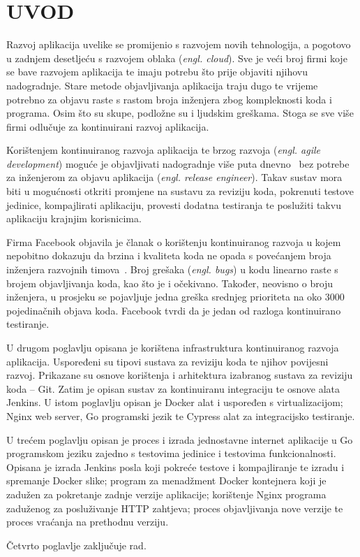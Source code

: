 \chapter{UVOD}
Razvoj aplikacija uvelike se promijenio s razvojem novih tehnologija, a pogotovo u zadnjem
desetljeću s razvojem oblaka (\textit{engl. cloud}). Sve je veći broj firmi koje se bave razvojem
aplikacija te imaju potrebu što prije objaviti njihovu nadogradnje. Stare metode objavljivanja
aplikacija traju dugo te vrijeme potrebno za objavu raste s rastom broja inženjera zbog kompleknosti
koda i programa. Osim što su skupe, podložne su i ljudskim greškama. Stoga se sve više firmi
odlučuje za kontinuirani razvoj aplikacija.

Korištenjem kontinuiranog razvoja aplikacija te brzog razvoja (\textit{engl. agile development})
moguće je objavljivati nadogradnje više puta dnevno~\citep{abrahamsson2017agile} bez potrebe za
inženjerom za objavu aplikacija (\textit{engl. release engineer}). Takav sustav mora biti u
mogućnosti otkriti promjene na sustavu za reviziju koda, pokrenuti testove jedinice, kompajlirati
aplikaciju, provesti dodatna testiranja te poslužiti takvu aplikaciju krajnjim korisnicima.

Firma Facebook objavila je članak o korištenju kontinuiranog razvoja u kojem nepobitno dokazuju da
brzina i kvaliteta koda ne opada s povećanjem broja inženjera razvojnih
timova~\citep{rossi2016continuous}. Broj grešaka (\textit{engl. bugs}) u kodu linearno raste s
brojem objavljivanja koda, kao što je i očekivano. Također, neovisno o broju inženjera, u prosjeku
se pojavljuje jedna greška srednjeg prioriteta na oko 3000 pojedinačnih objava koda. Facebook tvrdi
da je jedan od razloga kontinuirano testiranje.

U drugom poglavlju opisana je korištena infrastruktura kontinuiranog razvoja aplikacija. Uspoređeni
su tipovi sustava za reviziju koda te njihov povijesni razvoj. Prikazane su osnove korištenja i
arhitektura izabranog sustava za reviziju koda -- Git. Zatim je opisan sustav za kontinuiranu
integraciju te osnove alata Jenkins. U istom poglavlju opisan je Docker alat i uspoređen s
virtualizacijom; Nginx web server, Go programski jezik te Cypress alat za integracijsko testiranje.

U trećem poglavlju opisan je proces i izrada jednostavne internet aplikacije u Go programskom jeziku
zajedno s testovima jedinice i testovima funkcionalnosti. Opisana je izrada Jenkins posla koji
pokreće testove i kompajliranje te izradu i spremanje Docker slike; program za
menadžment Docker kontejnera koji je zadužen za pokretanje zadnje verzije aplikacije; korištenje
Nginx programa zaduženog za posluživanje HTTP zahtjeva; proces objavljivanja nove verzije te proces
vraćanja na prethodnu verziju.

Četvrto poglavlje zaključuje rad.
